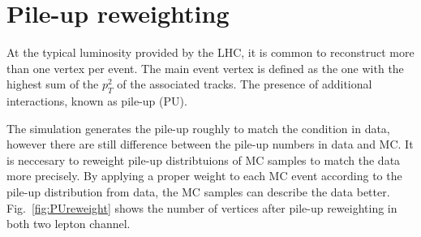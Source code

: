 
\section{Pile-up reweighting}
At the typical luminosity provided by the LHC, it is common to reconstruct more than one vertex per event. The main event vertex is defined as the one with the highest sum of the $p_{T}^{2}$ of the associated tracks. The presence of additional interactions, known as pile-up (PU). 

The simulation generates the pile-up roughly to match the condition in data, however there are still difference between the pile-up numbers in data and MC. It is neccesary to reweight pile-up distribtuions of MC samples to match the data more precisely. By applying a proper weight to each MC event according to the pile-up distribution from data, the MC samples can describe the data better. Fig.~\ref{fig:PUreweight} shows the number of vertices after pile-up reweighting in both two lepton channel.

